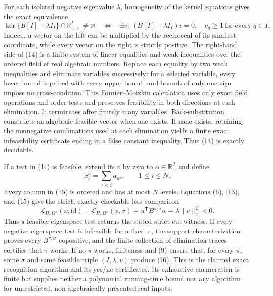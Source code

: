 For each isolated negative eigenvalue \(\lambda\), homogeneity of the kernel equations gives the exact equivalence
\[
 \ker\{B[I]-\lambda I_I\}\cap\mathbb R_{++}^I\neq\varnothing
 \quad\Longleftrightarrow\quad
 \exists v:\ (B[I]-\lambda I_I)v=0,
 \quad v_q\geq1\ \text{for every }q\in I. \tag{14}
\]
Indeed, a vector on the left can be multiplied by the reciprocal of its smallest coordinate, while every vector on the right is strictly positive.  The right-hand side of (14) is a finite system of linear equalities and weak inequalities over the ordered field of real algebraic numbers.  Replace each equality by two weak inequalities and eliminate variables successively: for a selected variable, every lower bound is paired with every upper bound, and bounds of only one sign impose no cross-condition.  This Fourier--Motzkin calculation uses only exact field operations and order tests and preserves feasibility in both directions at each elimination.  It terminates after finitely many variables.  Back-substitution constructs an algebraic feasible vector when one exists.  If none exists, retaining the nonnegative combinations used at each elimination yields a finite exact infeasibility certificate ending in a false constant inequality.  Thus (14) is exactly decidable.

If a test in (14) is feasible, extend its \(v\) by zero to \(\alpha\in\mathbb R_+^J\) and define
\[
 x_i^a=\sum_{r<i}\alpha_{ar},
 \qquad 1\leq i\leq N. \tag{15}
\]
Every column in (15) is ordered and has at most \(N\) levels.  Equations (6), (13), and (15) give the strict, exactly checkable loss comparison
\[
 \mathscr L_{H,\Omega^\pi}(x,\mathrm{id})
 -\mathscr L_{H,\Omega^\pi}(x,\sigma)
 =\alpha^{\mathsf T}B^{\pi,\sigma}\alpha
 =\lambda\lVert v\rVert_2^2<0. \tag{16}
\]
Thus a feasible eigenspace test returns the stated strict cut witness.  If every negative-eigenspace test is infeasible for a fixed \(\pi\), the support characterization proves every \(B^{\pi,\sigma}\) copositive, and the finite collection of elimination traces certifies that \(\pi\) works.  If no \(\pi\) works, finiteness and (9) ensure that, for every \(\pi\), some \(\sigma\) and some feasible triple \((I,\lambda,v)\) produce (16).  This is the claimed exact recognition algorithm and its yes/no certificates.  Its exhaustive enumeration is finite but supplies neither a polynomial running-time bound nor any algorithm for unrestricted, non-algebraically-presented real inputs.
